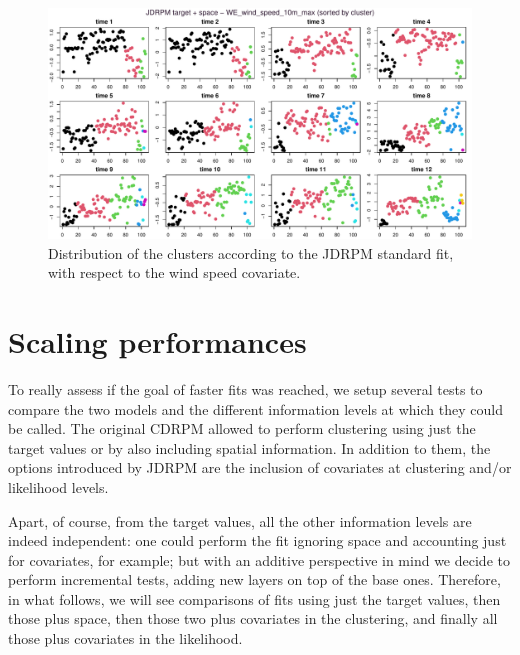 \documentclass[12pt,	%
	a4paper,		%
	twoside,		%
	openright,		%
	titlepage,%
	]{book}
\theoremstyle{definition}
\begin{document}
\begin{figure}[!ht]
    \centering
    \includegraphics[width=1\linewidth]{Testing/Covariates/in clustering/space J/WE_wind_speed_10m_max_sorted.pdf}
    \caption[JDRPM standard fit, clusters distribution with respect to the wind speed covariate]{Distribution of the clusters according to the JDRPM standard fit, with respect to the wind speed covariate.}
    \label{fig: J wind max sorted by cl}
\end{figure}


\section{Scaling performances}
\label{chap: Scaling performances}

To really assess if the goal of faster fits was reached, we setup several tests to compare the two models and the different information levels at which they could be called. The original CDRPM allowed to perform clustering using just the target values or by also including spatial information. In addition to them, the options introduced by JDRPM are the inclusion of covariates at clustering and/or likelihood levels. 

Apart, of course, from the target values, all the other information levels are indeed independent: one could perform the fit ignoring space and accounting just for covariates, for example; but with an additive perspective in mind we decide to perform incremental tests, adding new layers on top of the base ones. Therefore, in what follows, we will see comparisons of fits using just the target values, then those plus space, then those two plus covariates in the clustering, and finally all those plus covariates in the likelihood.
\end{document}
